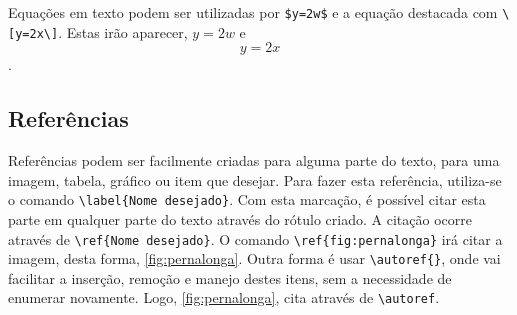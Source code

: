 Equações em texto podem ser utilizadas por \verb|$y=2w$| e a equação destacada com \verb|\[y=2x\]|. Estas irão aparecer, $y=2w$ e \[y=2x\].

\subsection{Referências}
\label{referencias}
Referências podem ser facilmente criadas para alguma parte do texto, para uma imagem, tabela, gráfico ou item que desejar. Para fazer esta referência, utiliza-se o comando \verb|\label{Nome desejado}|. Com esta marcação, é possível citar esta parte em qualquer parte do texto através do rótulo criado. A citação ocorre através de \verb|\ref{Nome desejado}|. 
O comando \verb|\ref{fig:pernalonga}| irá citar a imagem, desta forma, \ref{fig:pernalonga}. Outra forma é usar \verb|\autoref{}|, onde vai facilitar a inserção, remoção e manejo destes itens, sem a necessidade de enumerar novamente. Logo, \autoref{fig:pernalonga}, cita através de \verb|\autoref|.

